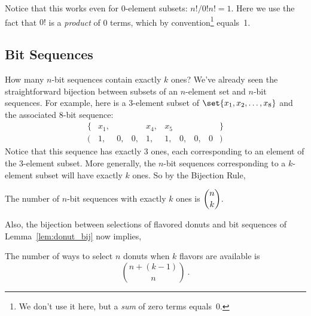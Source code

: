 Notice that this works even for 0-element subsets: $n!/0!n! = 1$.  Here we
use the fact that $0!$ is a \emph{product} of 0 terms, which by
convention\footnote{We don't use it here, but a \emph{sum} of zero
  terms equals~0.}
equals~1.

\subsection{Bit Sequences}

How many $n$-bit sequences contain exactly $k$ ones?  We've already seen
the straightforward bijection between subsets of an $n$-element set and
$n$-bit sequences.  For example, here is a 3-element subset of $\set{x_1,
x_2, \ldots, x_8}$ and the associated 8-bit sequence:
%
\[
\begin{array}{rccccccccl}
\{ & x_1, &    &    & x_4, & x_5  &    &    &   & \} \\
(  &   1, & 0, & 0, &   1, &   1, & 0, & 0, & 0 & )
\end{array}
\]
Notice that this sequence has exactly 3 ones, each corresponding to an
element of the 3-element subset.  More generally, the $n$-bit sequences
corresponding to a $k$-element subset will have exactly $k$ ones.  So by
the Bijection Rule,
\begin{corollary}
The number of $n$-bit sequences with exactly $k$ ones is $\dbinom{n}{k}$.
\end{corollary}

Also, the bijection between selections of flavored donuts and bit
sequences of Lemma~\ref{lem:donut_bij} now implies,
\begin{corollary}\label{cor:donut_binom}
The number of ways to select $n$ donuts when $k$ flavors are available is
\[
\binom{n + (k - 1)}{n}\ .
\]
\end{corollary}

\begin{problems}
  \practiceproblems

  \classproblems

  \homeworkproblems

  \examproblems

\end{problems}


